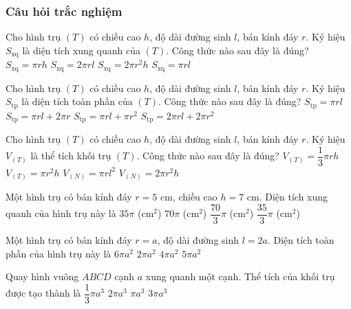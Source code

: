 \subsubsection{Câu hỏi trắc nghiệm}
\begin{ex}%
	Cho hình trụ $(T)$ có chiều cao $h$, độ dài đường sinh $l$, bán kính đáy $r$. Ký hiệu $S_{\text{xq}}$ là diện tích xung quanh của $(T)$. Công thức nào sau đây là đúng?
	\choice
	{$S_{\text{xq}}=\pi rh$}
	{\True $S_{\text{xq}}=2\pi rl$}
	{$S_{\text{xq}}=2\pi r^2h$}
	{$S_{\text{xq}}=\pi rl$}
\end{ex}
\begin{ex}%
	Cho hình trụ $(T)$ có chiều cao $h$, độ dài đường sinh $l$, bán kính đáy $r$. Ký hiệu $S_{\text{tp}}$ là diện tích toàn phần của $(T)$. Công thức nào sau đây là đúng?
	\choice
	{$S_{\text{tp}}=\pi rl$}
	{$S_{\text{tp}}=\pi rl+2\pi r$}
	{$S_{\text{tp}}=\pi rl+\pi r^2$}
	{\True $S_{\text{tp}}=2\pi rl+2\pi r^2$}
\end{ex}
\begin{ex}%
	Cho hình trụ $(T)$ có chiều cao $h$, độ dài đường sinh $l$, bán kính đáy $r$. Ký hiệu $V_{(T)}$ là thể tích khối trụ $(T)$. Công thức nào sau đây là đúng?
	\choice
	{$V_{(T)}=\dfrac{1}{3}\pi rh$}
	{\True $V_{(T)}=\pi r^2h$}
	{$V_{(N)}=\pi rl^2$}
	{$V_{(N)}=2\pi r^2h$}
\end{ex}
\begin{ex}%
	Một hình trụ có bán kính đáy $r=5$ cm, chiều cao $h=7$ cm. Diện tích xung quanh của hình trụ này là
	\choice
	{$35\pi$ (cm$^2$)}
	{\True $70\pi$ (cm$^2$)}
	{$\dfrac{70}{3}\pi$ (cm$^2$)}
	{$\dfrac{35}{3}\pi$ (cm$^2$)}
\end{ex}
\begin{ex}%
	Một hình trụ có bán kính đáy $r=a$, độ dài đường sinh $l=2a$. Diện tích toàn phần của hình trụ này là
	\choice
	{\True $6\pi a^2$}
	{$2\pi a^2$}
	{$4\pi a^2$}
	{$5\pi a^2$}
\end{ex}
\begin{ex}%
	Quay hình vuông $ABCD$ cạnh $a$ xung quanh một cạnh. Thể tích của khối trụ được tạo thành là
	\choice
	{$\dfrac{1}{3}\pi a^3$}
	{$2\pi a^3$}
	{\True $\pi a^3$}
	{$3\pi a^3$}
\end{ex}
